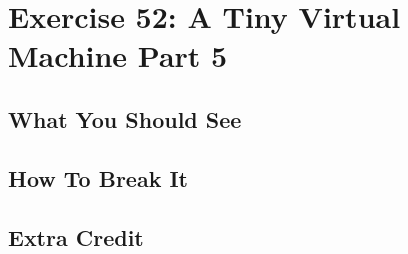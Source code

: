 \chapter{Exercise 52: A Tiny Virtual Machine Part 5}



\section{What You Should See}


\section{How To Break It}


\section{Extra Credit}



